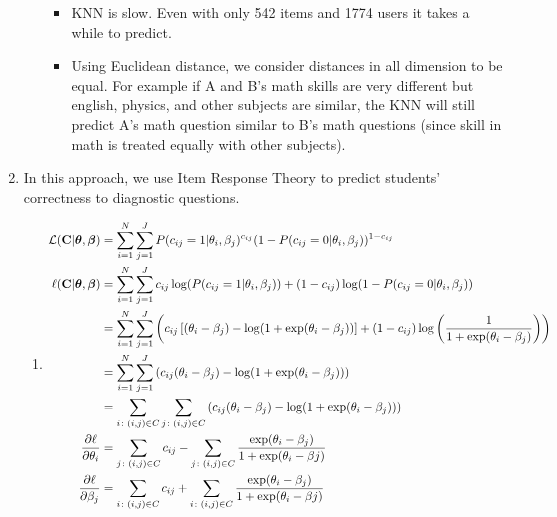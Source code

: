 \documentclass{article}
\newcommand{\bs}{\boldsymbol}
\newcommand{\mbf}[1]{\mathbf{#1}}
\newcommand{\mc}[1]{\mathcal{#1}}
\begin{document}
\begin{enumerate}[label=\arabic*.]
\begin{enumerate}[label=(\alph*)]
                \begin{itemize}
                    \item KNN is slow. Even with only 542 items and 1774 users it takes a while to predict.
                    \item Using Euclidean distance, we consider distances in all dimension to be equal. For example if A and B's math skills are very different but english, physics, and other subjects are similar, the KNN will still predict A's math question similar to B's math questions (since skill in math is treated equally with other subjects).
                \end{itemize}

        \end{enumerate}
        
    \item In this approach, we use Item Response Theory to predict students' correctness to diagnostic questions.
        \begin{enumerate}[label=(\alph*)]
            \item
                \begin{align*}
                    \mc L(\mbf C|\bs\theta,\bs\beta) &= \sum_{i=1}^{N}{\sum_{j=1}^{J}{P(c_{ij}=1|\theta_i,\beta_j)^{c_{ij}}(1-P(c_{ij}=0|\theta_i,\beta_j))^{1-c_{ij}}}} \\
                    \ell(\mbf C|\bs\theta, \bs\beta) &= \sum_{i=1}^{N}{\sum_{j=1}^{J}{c_{ij}\log(P(c_{ij}=1|\theta_i,\beta_j))+(1-c_{ij})\log(1-P(c_{ij}=0|\theta_i,\beta_j))}} \\
                                                     &= \sum_{i=1}^{N}{\sum_{j=1}^{J}{\left(c_{ij}\left[(\theta_i-\beta_j)-\log(1+\exp(\theta_i-\beta_j))\right]+(1-c_{ij})\log \left(\frac{1}{1+\exp(\theta_i-\beta_j)}\right)\right)}} \\
                                                     &= \sum_{i=1}^{N}{\sum_{j=1}^{J}{\left(c_{ij}(\theta_i-\beta_j)-\log(1+\exp(\theta_i-\beta_j))\right)}} \\
                                                     &= \sum_{i\colon (i, j)\in C}{\sum_{j\colon (i, j)\in C}{\left(c_{ij}(\theta_i-\beta_j)-\log(1+\exp(\theta_i-\beta_j))\right)}} \\
                    \pdv{\ell}{\theta_i} &= \sum_{j\colon (i, j)\in C}{c_{ij}}-\sum_{j\colon (i, j)\in C}{\frac{\exp(\theta_i-\beta_j)}{1+\exp(\theta_i-\beta j)}} \\
                    \pdv{\ell}{\beta_j} &= \sum_{i\colon (i, j)\in C}{c_{ij}} + \sum_{i\colon (i, j)\in C}{\frac{\exp(\theta_i-\beta_j)}{1+\exp(\theta_i-\beta j)}}

\end{align*}
\end{enumerate}
\end{enumerate}
\end{document}
